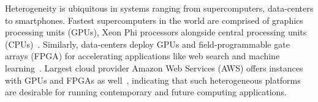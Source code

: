 






%

Heterogeneity is ubiquitous in systems ranging from supercomputers, data-centers
to smartphones. Fastest supercomputers in the world are comprised of graphics
processing units (GPUs), Xeon Phi processors alongside central processing units
(CPUs)~\cite{top500nov}. Similarly, data-centers deploy GPUs and field-programmable
gate arrays (FPGA) for accelerating applications like web search and machine
learning~\cite{catapultmicrosoft}. Largest cloud provider Amazon Web Services (AWS) offers
instances with GPUs and FPGAs as well~\cite{awsinstances}, indicating that such
heterogeneous platforms are desirable for running contemporary and future
computing applications.

